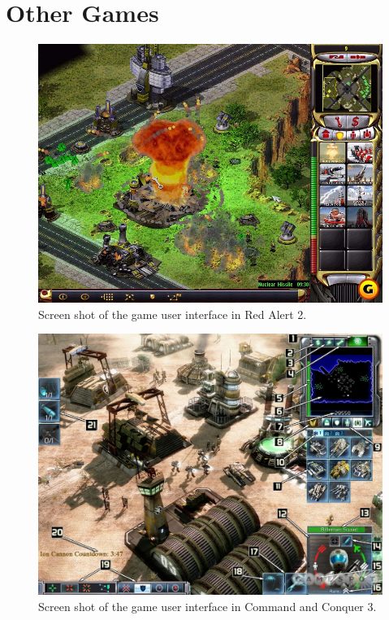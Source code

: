 \chapter{Other Games}

\begin{figure}[H]
\begin{center}
\includegraphics[scale=0.45]{Images/red_alert_screenshot.png}
\end{center}
\caption{Screen shot of the game user interface in Red Alert 2.}
\label{pic:red_alert}
\end{figure}


\begin{figure}[H]
\begin{center}
\includegraphics[scale=0.3]{Images/coc_screenshot.png}
\end{center}
\caption{Screen shot of the game user interface in Command and Conquer 3.}
\label{pic:coc}
\end{figure}